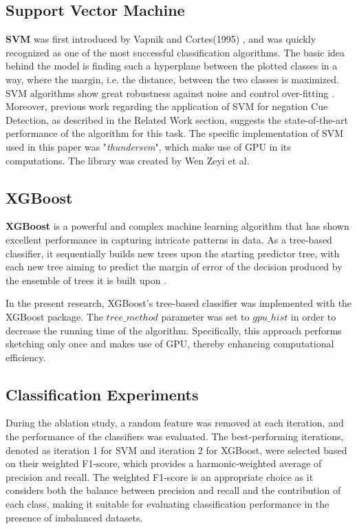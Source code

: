 \subsection{Support Vector Machine} 
\textbf{SVM} was first introduced by Vapnik and Cortes(1995) \cite{vapnik1995}, and was quickly recognized as one of the most successful classification algorithms. The basic idea behind the model is finding such a hyperplane between the plotted classes in a way, where the margin, i.e. the distance, between the two classes is maximized. SVM algorithms show great robustness against noise and control over-fitting \cite{robust2009}. Moreover, previous work regarding the application of SVM for negation Cue Detection, as described in the Related Work section, suggests the state-of-the-art performance of the algorithm for this task. The specific implementation of SVM used in this paper was  "\textit{thundersvm}", which make use of GPU in its computations. The library was created by Wen Zeyi et al. \cite{thundersvm}


\subsection{XGBoost}
\textbf{XGBoost} is a powerful and complex machine learning algorithm that has shown excellent performance in capturing intricate patterns in data. As a tree-based classifier, it sequentially builds new trees upon the starting predictor tree, with each new tree aiming to predict the margin of error of the decision produced by the ensemble of trees it is built upon \cite{minasny2009elements}.

In the present research, XGBoost's tree-based classifier was implemented with the XGBoost package. The $tree\_method$ parameter was set to $gpu\_hist$ in order to decrease the running time of the algorithm. Specifically, this approach performs sketching only once and makes use of GPU, thereby enhancing computational efficiency.

\FloatBarrier
\subsection{Classification Experiments}

During the ablation study, a random feature was removed at each iteration, and the performance of the classifiers was evaluated. The best-performing iterations, denoted as iteration 1 for SVM and iteration 2 for XGBoost, were selected based on their weighted F1-score, which provides a harmonic-weighted average of precision and recall. The weighted F1-score is an appropriate choice as it considers both the balance between precision and recall and the contribution of each class, making it suitable for evaluating classification performance in the presence of imbalanced datasets.


